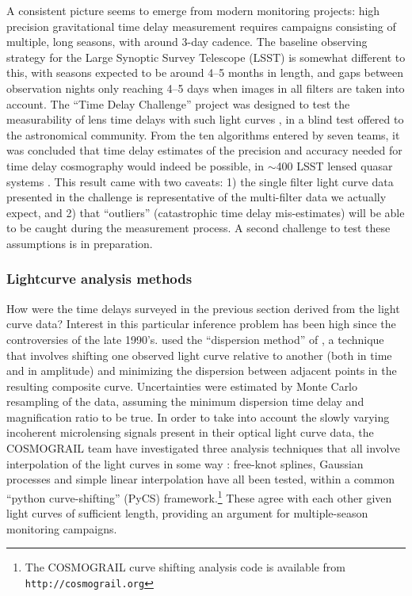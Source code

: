 A consistent picture seems to emerge from modern monitoring projects:
high precision gravitational time delay measurement requires campaigns
consisting of multiple, long seasons, with around 3-day cadence. The
baseline observing strategy for the Large Synoptic Survey Telescope
(LSST) is somewhat different to this, with seasons expected to be
around 4--5 months in length, and gaps between observation nights only
reaching 4--5 days when images in all filters are taken into
account. The ``Time Delay Challenge'' project was designed to test the
measurability of lens time delays with such light curves
\citep{DoblerEtal2015}, in a blind test offered to the astronomical
community. From the ten algorithms entered by seven teams, it was
concluded that time delay estimates of the precision and accuracy
needed for time delay cosmography would indeed be possible, in
$\sim$400 LSST lensed quasar systems \citep{LiaoEtal2015}. This result
came with two caveats: 1) the single filter light curve data presented
in the challenge is representative of the multi-filter data we
actually expect, and 2) that ``outliers'' (catastrophic time delay
mis-estimates) will be able to be caught during the measurement
process.  A second challenge to test these assumptions is in
preparation.




\subsubsection{Lightcurve analysis methods}

How were the time delays surveyed in the previous section derived from
the light curve data? Interest in this particular inference problem
has been high since the controversies of the late
1990's. \citet{Fas++99} used the ``dispersion method'' of
\citet{Pelt++96}, a technique that involves shifting one observed
light curve relative to another (both in time and in amplitude) and
minimizing the dispersion between adjacent points in the resulting
composite curve. Uncertainties were estimated by Monte Carlo
resampling of the data, assuming the minimum dispersion time delay and
magnification ratio to be true. In order to take into account the
slowly varying incoherent microlensing signals present in their
optical light curve data, the COSMOGRAIL team have investigated three
analysis techniques that all involve interpolation of the light curves
in some way \citep{TCM13}: free-knot splines, Gaussian processes and
simple linear interpolation have all been tested, within a common
``python curve-shifting'' (PyCS) framework.\footnote{The COSMOGRAIL
curve shifting analysis code is available from
\texttt{http://cosmograil.org}} These agree with each other given
light curves of sufficient length, providing an argument for
multiple-season monitoring campaigns.


